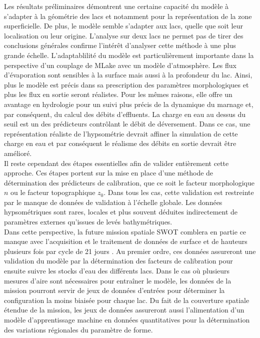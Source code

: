 Les résultats préliminaires démontrent une certaine capacité du modèle à s'adapter à la géométrie des lacs et notamment pour la représentation de la zone superficielle. De plus, le modèle semble s'adapter aux lacs, quelle que soit leur localisation ou leur origine. L'analyse sur deux lacs ne permet pas de tirer des conclusions générales confirme l'intérêt d'analyser cette méthode à une plus grande échelle. L'adaptablilité du modèle est particulièrement importante dans la perspective d'un couplage de MLake avec un modèle d'atmosphère. Les flux d'évaporation sont sensibles à la surface mais aussi à la profondeur du lac. Ainsi, plus le modèle est précis dans sa prescription des paramètres morphologiques et plus les flux en sortie seront réalistes. Pour les mêmes raisons, elle offre un avantage en hydrologie pour un suivi plus précis de la dynamique du marnage et, par conséquent, du calcul des débits d'effluents. La charge en eau au dessus du seuil est un des prédicteurs contrôlant le débit de déversement. Dans ce cas, une représentation réaliste de l'hypsométrie devrait affiner la simulation de cette charge en eau et par conséquent le réalisme des débits en sortie devrait être amélioré.\\

Il reste cependant des étapes essentielles afin de valider entièrement cette approche. Ces étapes portent sur la mise en place d'une méthode de détermination des prédicteurs de calibration, que ce soit le facteur morphologique $n$ ou le facteur topographique $z_0$. Dans tous les cas, cette validation est restreinte par le manque de données de validation à l'échelle globale. Les données hypsométriques sont rares, locales et plus souvent déduites indirectement de paramètres externes qu'issues de levés bathymétriques.\\
Dans cette perspective, la future mission spatiale SWOT comblera en partie ce manque avec l'acquisition et le traitement de données de surface et de hauteurs plusieurs fois par cycle de 21 jours \citep{biancamaria2016}. Au premier ordre, ces données assureront une validation du modèle par la détermination des facteurs de calibration pour ensuite suivre les stocks d'eau des différents lacs. Dans le cas où plusieurs mesures d'aire sont nécessaires pour entraîner le modèle, les données de la mission pourront servir de jeux de données d'entrées pour déterminer la configuration la moins biaisée pour chaque lac. Du fait de la couverture spatiale étendue de la mission, les jeux de données assureront aussi l'alimentation d'un modèle d'apprentissage machine en données quantitatives pour la détermination des variations régionales du paramètre de forme.\\


